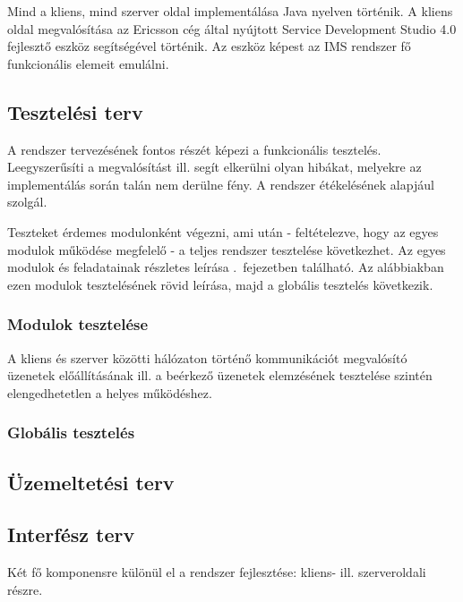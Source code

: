 Mind a kliens, mind szerver oldal implementálása Java nyelven történik. A kliens oldal megvalósítása az Ericsson cég által nyújtott Service Development Studio 4.0 fejlesztő eszköz segítségével történik. Az eszköz képest az IMS rendszer fő funkcionális elemeit emulálni.


\subsection{Tesztelési terv}
\label{sec:tesztelesi_terv}

A rendszer tervezésének fontos részét képezi a funkcionális tesztelés. Leegyszerűsíti a megvalósítást ill. segít elkerülni olyan hibákat, melyekre az imp\-le\-men\-tá\-lás során talán nem derülne fény. A rendszer étékelésének alapjául szolgál.

Teszteket érdemes modulonként végezni, ami után - feltételezve, hogy az egyes mo\-du\-lok működése megfelelő - a teljes rendszer tesztelése következhet. %
Az egyes modulok és feladatainak részletes leírása .~fejezetben található. Az alábbiakban ezen modulok tesztelésének rövid leírása, majd a globális tesztelés következik.

\subsubsection{Modulok tesztelése}

A kliens és szerver közötti hálózaton történő kommunikációt megvalósító üzenetek előállításának ill. a beérkező üzenetek elemzésének tesztelése szintén elengedhetetlen a helyes működéshez.

\subsubsection{Globális tesztelés}

\subsection{Üzemeltetési terv}
\label{sec:uzemeltetesi_terv}

\subsection{Interfész terv}
\label{sec:interfesz_terv}

Két fő komponensre különül el a rendszer fejlesztése: kliens-
ill. szerveroldali részre.

